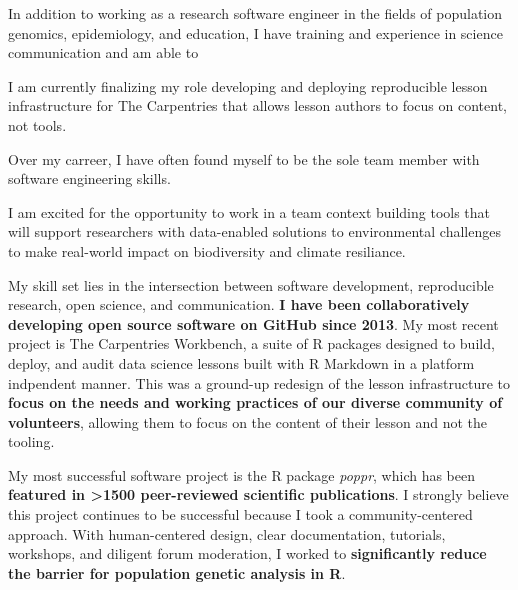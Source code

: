 In addition to working as a research software engineer in the fields of
population genomics, epidemiology, and education, I have training and
experience in science communication and am able to 

I am currently finalizing my role developing and deploying reproducible lesson
infrastructure for The Carpentries that allows lesson authors to focus on
content, not tools.

Over my carreer, I have often found myself to be the sole team member with
software engineering skills. 

I am excited for the opportunity to work in a team context building tools that
will support researchers with data-enabled solutions to environmental
challenges to make real-world impact on biodiversity and climate resiliance.


\vspace{1ex}


My skill set lies in the intersection between software development,
reproducible research, open science, and communication. 
\textbf{I have been collaboratively developing open source software on GitHub
since 2013}.
My most recent project is The Carpentries Workbench, a suite of R packages
designed to build, deploy, and audit data science lessons built with R Markdown
in a platform indpendent manner. This was a ground-up redesign of the lesson
infrastructure to \textbf{focus on the needs and working practices of our
diverse community of volunteers}, allowing them to focus on the content of
their lesson and not the tooling.

\vspace{1ex}



\vspace{1ex}

My most successful software project is the R package
\textit{poppr}, which has been \textbf{featured in \textgreater1500
peer-reviewed scientific publications}. I strongly believe this project 
continues to be successful because I took a community-centered approach. With
human-centered design, clear documentation, tutorials, workshops, and diligent
forum moderation, I worked to \textbf{significantly reduce the barrier
for population genetic analysis in R}.


